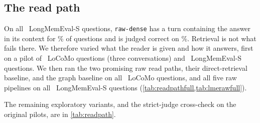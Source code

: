\documentclass[11pt,letterpaper]{article}
\newcommand{\pipe}[1]{\texttt{#1}}
\begin{document}
\subsection{The read path}
\label{sec:readpath}

On all \numFullLmeQuestions\ LongMemEval-S questions, \pipe{raw-dense} has a turn containing the answer in its context for \numFullLmeEvidenceDense\% of questions and is judged correct on \numFullLmeRawDenseJudged\%. Retrieval is not what fails there. We therefore varied what the reader is given and how it answers, first on a pilot of \numReadQuestions\ LoCoMo questions (three conversations) and \numReadLmeQuestions\ LongMemEval-S questions. We then ran the two promising raw read paths, their direct-retrieval baseline, and the graph baseline on all \numFullReadQuestions\ LoCoMo questions, and all five raw pipelines on all \numFullLmeQuestions\ LongMemEval-S questions (\cref{tab:readpathfull,tab:lmerawfull}).

\begin{table}[ht]
\centering
\caption{Full-scale LoCoMo read-path comparison, \numFullReadQuestions\ questions. F1 and judged accuracy have 95\% intervals. The last accuracy column is the paired difference from \pipe{raw-dense}, with its own 95\% interval; tokens are the mean reader and retrieval-stage prompt size.}
\label{tab:readpathfull}
\small
\resizebox{\textwidth}{!}{}
\end{table}

\begin{table}[ht]
\centering
\caption{All \numFullLmeQuestions\ LongMemEval-S questions for the pipelines that build no graph. Columns are as in \cref{tab:readpathfull}. The full-context pipeline was omitted to avoid 500 prompts of about 112,000 tokens each.}
\label{tab:lmerawfull}
\small
\resizebox{\textwidth}{!}{}
\end{table}

The remaining exploratory variants, and the strict-judge cross-check on the original pilots, are in \cref{tab:readpath}.

\begin{table}[ht]
\centering
\caption{Exploratory read-path pilots. Left: LoCoMo pilot, \numReadQuestions\ questions, judged accuracy by the original and the stricter judge, the paired difference from \pipe{raw-dense} under the stricter judge, and prompt tokens. Right: LongMemEval-S, \numReadLmeQuestions\ questions (both judges agree). \pipe{-reason} pipelines use a reader that works through the evidence before answering.}
\label{tab:readpath}
\small
\resizebox{\textwidth}{!}{}
\end{table}
\end{document}
